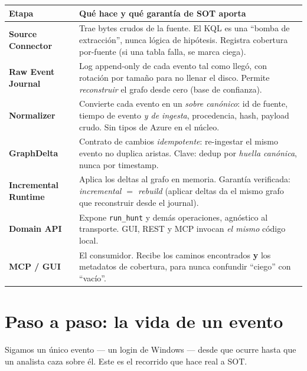 \documentclass[11pt,a4paper]{article}
\newcommand{\term}[1]{\textcolor{ghblue}{\textbf{#1}}}
\newcommand{\code}[1]{\texttt{\small #1}}
\begin{document}
\begin{center}
\renewcommand{\arraystretch}{1.3}
\begin{tabular}{@{}p{3.1cm}p{11.3cm}@{}}
\toprule
\textbf{Etapa} & \textbf{Qué hace y qué garantía de SOT aporta} \\
\midrule
\term{Source Connector} & Trae bytes crudos de la fuente. El KQL es una ``bomba de extracción'', nunca lógica de hipótesis. Registra cobertura por-fuente (si una tabla falla, se marca ciega). \\
\term{Raw Event Journal} & Log append-only de cada evento tal como llegó, con rotación por tamaño para no llenar el disco. Permite \emph{reconstruir} el grafo desde cero (base de confianza). \\
\term{Normalizer} & Convierte cada evento en un \emph{sobre canónico}: id de fuente, tiempo de evento \emph{y de ingesta}, procedencia, hash, payload crudo. Sin tipos de Azure en el núcleo. \\
\term{GraphDelta} & Contrato de cambios \emph{idempotente}: re-ingestar el mismo evento no duplica aristas. Clave: dedup por \emph{huella canónica}, nunca por timestamp. \\
\term{Incremental Runtime} & Aplica los deltas al grafo en memoria. Garantía verificada: \emph{incremental $=$ rebuild} (aplicar deltas da el mismo grafo que reconstruir desde el journal). \\
\term{Domain API} & Expone \code{run\_hunt} y demás operaciones, agnóstico al transporte. GUI, REST y MCP invocan \emph{el mismo} código local. \\
\term{MCP / GUI} & El consumidor. Recibe los caminos encontrados \textbf{y} los metadatos de cobertura, para nunca confundir ``ciego'' con ``vacío''. \\
\bottomrule
\end{tabular}
\end{center}

\section{Paso a paso: la vida de un evento}

Sigamos un único evento --- un login de Windows --- desde que ocurre hasta que
un analista caza sobre él. Este es el recorrido que hace real a SOT.
\end{document}
